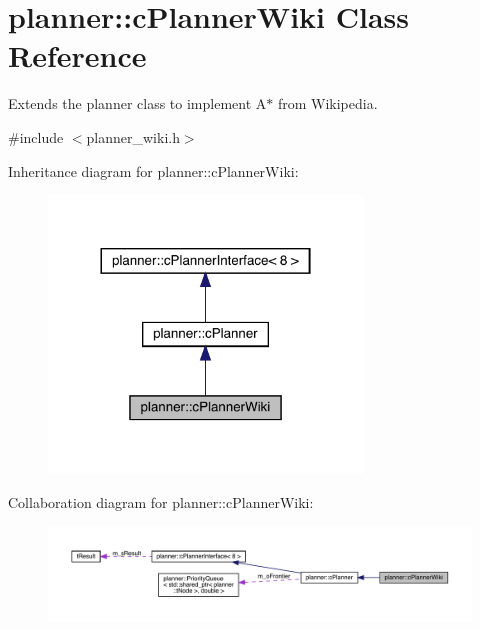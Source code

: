 \hypertarget{classplanner_1_1c_planner_wiki}{}\section{planner\+:\+:c\+Planner\+Wiki Class Reference}
\label{classplanner_1_1c_planner_wiki}


Extends the planner class to implement A$\ast$ from Wikipedia.  




{\ttfamily \#include $<$planner\+\_\+wiki.\+h$>$}



Inheritance diagram for planner\+:\+:c\+Planner\+Wiki\+:\nopagebreak
\begin{figure}[H]
\begin{center}
\leavevmode
\includegraphics[width=236pt]{classplanner_1_1c_planner_wiki__inherit__graph}
\end{center}
\end{figure}


Collaboration diagram for planner\+:\+:c\+Planner\+Wiki\+:\nopagebreak
\begin{figure}[H]
\begin{center}
\leavevmode
\includegraphics[width=350pt]{classplanner_1_1c_planner_wiki__coll__graph}
\end{center}
\end{figure}
